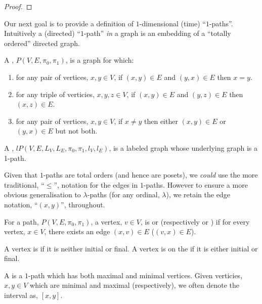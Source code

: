 \documentclass[a4paper]{amsart}
\begin{document}
\begin{proof}
\end{proof}


Our next goal is to provide a definition of $1$-dimensional (time) ``$1$-paths''.
Intuitively a (directed) ``$1$-path'' \emph{in} a graph is an embedding of a ``totally
ordered'' directed graph.


\begin{definition}
A , $P(V, E, \pi_0, \pi_1)$, is a graph for which:

\begin{enumerate}
\item {} for any pair of vertices, $x, y \in V$, if $(x,y) \in E$ and
$(y,x) \in E$ then $x = y$.
\item {} for any triple of verticies, $x, y, z \in V$, 
if $(x,y) \in E$ and $(y,z) \in E$ then $(x,z) \in E$.
\item {} for any pair of vertices, $x, y \in V$, if $x \neq y$ then
either $(x,y) \in E$ or $(y,x) \in E$ but not both.
\end{enumerate}

A , $lP(V, E, L_V, L_E, \pi_0, \pi_1, l_V, l_E)$, is a labeled 
graph whose underlying graph is a 1-path.
\end{definition}

Given that $1$-paths are total orders (and hence are posets), we \emph{could} use the more
traditional, ``$\leq$'', notation for the edges in $1$-paths. However to ensure a more
obvious generalisation to $\lambda$-paths (for any ordinal, $\lambda$), we retain the edge
notation, ``$(x,y)$'', throughout.

\begin{definition}
For a path, $P(V, E, \pi_0, \pi_1)$, a vertex, $v \in V$, is  or
 (respectively  or ) if for every
vertex, $x \in V$, there exists an edge $(x,v) \in E$ ($(v, x) \in E$).

A vertex is  if it is neither initial or final. A vertex is on the  
 if it is either initial or final.

A  is a $1$-path which has both maximal and minimal vertices. Given 
verticies, $x, y \in V$ which are minimal and maximal (respectively), we often denote the 
interval as, $[x,y]$.
\end{definition}
\end{document}
